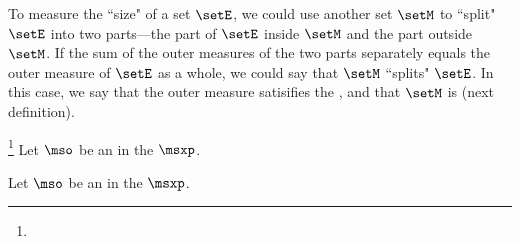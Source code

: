 {To measure the ``size" of a set $\setE$, we could use another set $\setM$ to ``split" $\setE$ into 
two parts---the part of $\setE$ inside $\setM$ and the part outside $\setM$.
If the sum of the outer measures of the two parts separately equals the outer measure of $\setE$
as a whole, we could say that $\setM$ ``splits" $\setE$.
In this case, we say that the outer measure satisifies the ,
and that $\setM$ is  (next definition).
\begin{definition}
\label{def:mso_m}
\footnote{
  }
Let $\mso$ be an  in the  $\msxp$.
\end{definition}

\begin{definition}
\label{def:null_set}
Let $\mso$ be an  in the  $\msxp$.
\end{definition}

}
